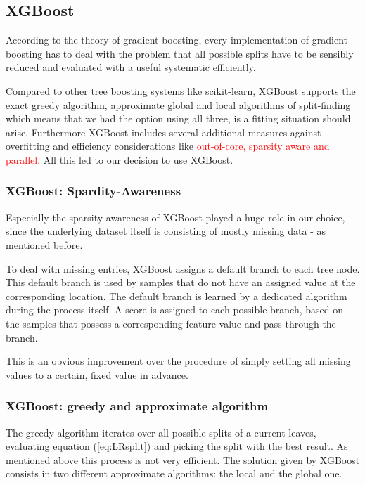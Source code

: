 \subsection{XGBoost}

According to the theory of gradient boosting, every implementation of gradient boosting has to deal with the problem that all possible splits have to be sensibly reduced and evaluated with a useful systematic  efficiently.

Compared to other tree boosting systems like scikit-learn, XGBoost supports the exact greedy algorithm, approximate global and local algorithms of split-finding which means that we had the option using all three, is a fitting situation should arise. Furthermore XGBoost includes several additional measures against overfitting and efficiency considerations like \textcolor{red}{out-of-core, sparsity aware and parallel}.  All this led to our decision to use XGBoost.

\subsubsection{XGBoost: Spardity-Awareness}

Especially the sparsity-awareness of XGBoost played a huge role in our choice, since the underlying dataset itself is consisting of mostly missing data - as mentioned before.

To deal with missing entries, XGBoost assigns a default branch to each tree node. This default branch is used by samples that do not have an assigned value at the corresponding location. The default branch is learned by a dedicated algorithm during the process itself. A score is assigned to each possible branch, based on the samples that possess a corresponding feature value and pass through the branch.

This is an obvious improvement over the procedure of simply setting all missing values to a certain, fixed value in advance.

\subsubsection{XGBoost: greedy and approximate algorithm}
The greedy algorithm iterates over all possible splits of a current leaves, evaluating equation (\ref{eq:LRsplit}) and picking the split with the best result. As mentioned above this process is not very efficient. The solution given by XGBoost consists in two different approximate algorithms: the local and the global one.

